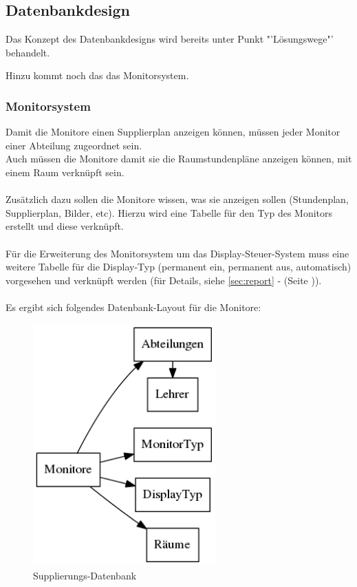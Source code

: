 \subsection{Datenbankdesign}

Das Konzept des Datenbankdesigns wird bereits unter Punkt "'Lösungswege"' behandelt.

Hinzu kommt noch das das Monitorsystem.

\subsubsection{Monitorsystem}

Damit die Monitore einen Supplierplan anzeigen können, müssen jeder Monitor einer Abteilung zugeordnet sein.\\
Auch müssen die Monitore damit sie die Raumstundenpläne anzeigen können, mit einem Raum verknüpft sein.\\
\\
Zusätzlich dazu sollen die Monitore wissen, was sie anzeigen sollen (Stundenplan, Supplierplan, Bilder, etc). Hierzu wird eine Tabelle für den Typ des Monitors erstellt und diese verknüpft.\\
\\ 
Für die Erweiterung des Monitorsystem um das Display-Steuer-System muss eine weitere Tabelle für die Display-Typ (permanent ein, permanent aus, automatisch) vorgesehen und verknüpft werden (für Details, siehe \autoref{sec:report} -   (Seite \pageref{sec:report})).\\
\\
Es ergibt sich folgendes Datenbank-Layout für die Monitore:
\begin{figure}[H]
\centering
\includegraphics[keepaspectratio=true, width=7cm]{images/dbMonitors.png}
\caption{Supplierungs-Datenbank}
\end{figure}
